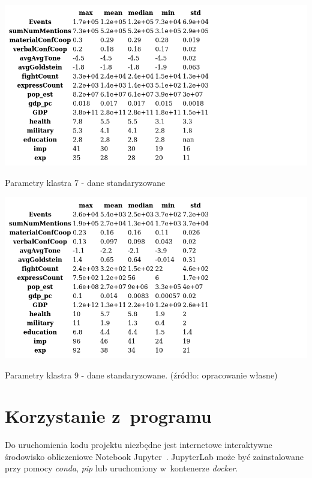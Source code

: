 \documentclass[11pt]{report}
\begin{document}
    \begin{table}[!htp]
        \centering
        \includegraphics[width=\linewidth]{tables/CLUST/desc/clust7std_desc.png}
        \caption{Parametry klastra 7 - dane standaryzowane}
        \label{tab:cl7std_desc}
    \end{table}

    \begin{table}[!htp]
        \centering
        \includegraphics[width=\linewidth]{tables/CLUST/desc/clust9std_desc.png}
        \caption{Parametry klastra 9 - dane standaryzowane. (źródło: opracowanie własne)}
        \label{tab:cl9std_desc}
    \end{table}


    \chapter{Korzystanie z~programu}\label{ch:korzystanie-z-programu}
    Do uruchomienia kodu projektu niezbędne jest internetowe interaktywne środowisko obliczeniowe Notebook Jupyter~\cite{jupyter}.
    JupyterLab może być zainstalowane przy pomocy \textit{conda}, \textit{pip} lub uruchomiony w~kontenerze \textit{docker}.
\end{document}
